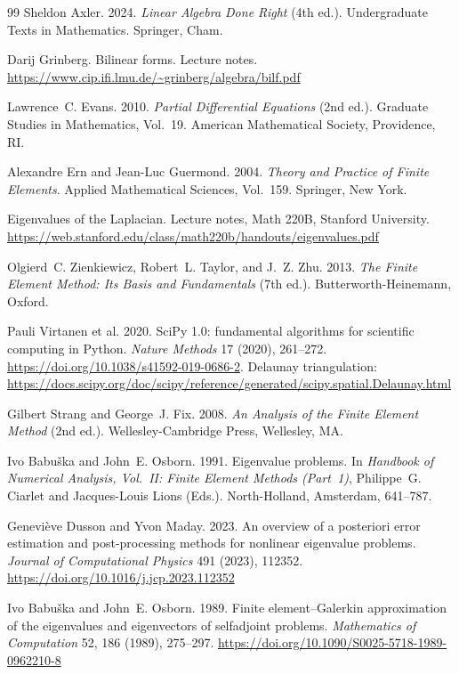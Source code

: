 \documentclass[acmsmall,screen]{MapleTrans}
\begin{document}
\begin{thebibliography}{99}
 Sheldon Axler. 2024. \textit{Linear Algebra Done Right} (4th ed.). Undergraduate Texts in Mathematics. Springer, Cham.

 Darij Grinberg. Bilinear forms. Lecture notes. \url{https://www.cip.ifi.lmu.de/~grinberg/algebra/bilf.pdf}

 Lawrence~C. Evans. 2010. \textit{Partial Differential Equations} (2nd ed.). Graduate Studies in Mathematics, Vol.~19. American Mathematical Society, Providence, RI.

 Alexandre Ern and Jean-Luc Guermond. 2004. \textit{Theory and Practice of Finite Elements}. Applied Mathematical Sciences, Vol.~159. Springer, New York.

 Eigenvalues of the Laplacian. Lecture notes, Math 220B, Stanford University. \url{https://web.stanford.edu/class/math220b/handouts/eigenvalues.pdf}

 Olgierd~C. Zienkiewicz, Robert~L. Taylor, and J.~Z. Zhu. 2013. \textit{The Finite Element Method: Its Basis and Fundamentals} (7th ed.). Butterworth-Heinemann, Oxford.

 Pauli Virtanen et al. 2020. SciPy 1.0: fundamental algorithms for scientific computing in Python. \textit{Nature Methods} 17 (2020), 261--272. \url{https://doi.org/10.1038/s41592-019-0686-2}. Delaunay triangulation: \url{https://docs.scipy.org/doc/scipy/reference/generated/scipy.spatial.Delaunay.html}

 Gilbert Strang and George~J. Fix. 2008. \textit{An Analysis of the Finite Element Method} (2nd ed.). Wellesley-Cambridge Press, Wellesley, MA.

 Ivo Babu\v{s}ka and John~E. Osborn. 1991. Eigenvalue problems. In \textit{Handbook of Numerical Analysis, Vol.~II: Finite Element Methods (Part~1)}, Philippe~G. Ciarlet and Jacques-Louis Lions (Eds.). North-Holland, Amsterdam, 641--787.

 Genevi\`eve Dusson and Yvon Maday. 2023. An overview of a posteriori error estimation and post-processing methods for nonlinear eigenvalue problems. \textit{Journal of Computational Physics} 491 (2023), 112352. \url{https://doi.org/10.1016/j.jcp.2023.112352}

 Ivo Babu\v{s}ka and John~E. Osborn. 1989. Finite element--Galerkin approximation of the eigenvalues and eigenvectors of selfadjoint problems. \textit{Mathematics of Computation} 52, 186 (1989), 275--297. \url{https://doi.org/10.1090/S0025-5718-1989-0962210-8}


\end{thebibliography}
\end{document}
